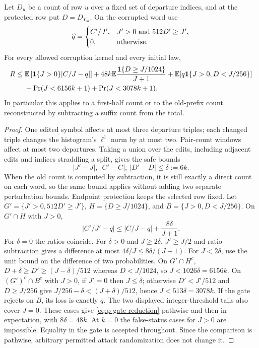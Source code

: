 \begin{lemma}\label{lem:gate}
Let $D_u$ be a count of row $u$ over a fixed set of departure indices,
and at the protected row put $D=D_{Y_M}$.  On the corrupted word use
\[
 \widehat q=\begin{cases}
 C'/J',&J'>0\ \hbox{and }512D'\ge J',\\
 0,&\hbox{otherwise}.
 \end{cases}
\]
For every allowed corruption kernel and every initial law,
\begin{align}\label{eq:p-gate-reduction}
 R\le{}&\mathbb E\left[\mathbf1\{J>0\}|C/J-q|\right]
 +48k\mathbb E\frac{\mathbf1\{D\ge J/1024\}}{J+1}
 +\mathbb E[q\mathbf1\{J>0,D<J/256\}]\notag\\
 &+\Pr(J<6156k+1)+\Pr(J<3078k+1).
\end{align}
In particular this applies to a first-half count or to the old-prefix
count reconstructed by subtracting a suffix count from the total.
\end{lemma}
\begin{proof}
One edited symbol affects at most three departure triples; each changed
triple changes the histogram's $\ell^1$ norm by at most two.  Pair-count
windows affect at most two departures.  Taking a union over the edits,
including adjacent edits and indices straddling a split, gives the safe
bounds
\[
 |J'-J|,\ |C'-C|,\ |D'-D|\le\delta:=6k.
\]
When the old count is computed by subtraction, it is still exactly a
direct count on each word, so the same bound applies without adding
two separate perturbation bounds.  Endpoint protection keeps the selected
row fixed.
Let $G'=\{J'>0,512D'\ge J'\}$,
$H=\{D\ge J/1024\}$, and
$B=\{J>0,D<J/256\}$.  On $G'\cap H$ with $J>0$,
\[
 |C'/J'-q|\le|C/J-q|+\frac{8\delta}{J+1}.
\]
For $\delta=0$ the ratios coincide.  For $\delta>0$ and $J\ge2\delta$,
$J'\ge J/2$ and ratio subtraction gives a difference at most
$4\delta/J\le8\delta/(J+1)$.  For $J<2\delta$, use the unit bound on
the difference of two probabilities.
On $G'\cap H^c$,
$D+\delta\ge D'\ge(J-\delta)/512$ whereas $D<J/1024$,
so $J<1026\delta=6156k$.
On $(G')^c\cap B^c$ with $J>0$, if $J'=0$ then $J\le\delta$;
otherwise $D'<J'/512$ and $D\ge J/256$ give
$J/256-\delta<(J+\delta)/512$, hence $J<513\delta=3078k$.
If the gate rejects on $B$, its loss is exactly $q$.
The two displayed integer-threshold tails also cover $J=0$.
These cases give \eqref{eq:p-gate-reduction} pathwise and then in
expectation, with $8\delta=48k$.  At $k=0$ the false-status cases for
$J>0$ are impossible.  Equality in the gate is accepted throughout.
Since the comparison is pathwise, arbitrary permitted attack randomization
does not change it.
\end{proof}

